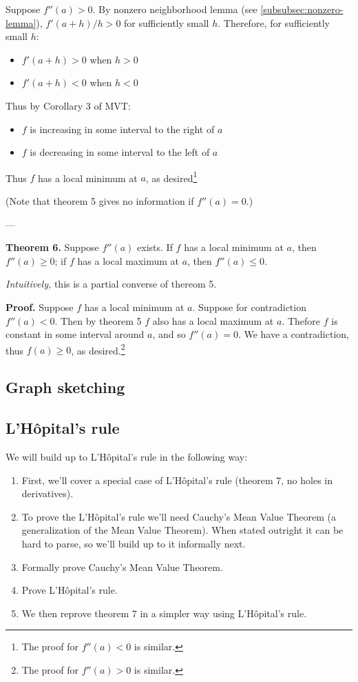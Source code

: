 Suppose $f''(a)>0$. By nonzero neighborhood lemma (see
\ref{subsubsec:nonzero-lemma}), $f'(a+h)/h>0$ for sufficiently small
$h$. Therefore, for sufficiently small $h$:
\begin{itemize}
\item $f'(a+h)>0$ when $h>0$
\item $f'(a+h)<0$ when $h<0$
\end{itemize}

Thus by Corollary 3 of MVT:
\begin{itemize}
\item $f$ is increasing in some interval to the right of $a$
\item $f$ is decreasing in some interval to the left of $a$
\end{itemize}

Thus $f$ has a local minimum at $a$, as desired\footnote{The proof for
  $f''(a)<0$ is similar.}

\vs

(Note that theorem 5 gives no information if $f''(a)=0$.)

\vs---\vs

\textbf{Theorem 6.} Suppose $f''(a)$ exists. If $f$ has a local
minimum at $a$, then $f''(a)\geq0$; if $f$ has a local maximum at $a$,
then $f''(a)\leq 0$.

\vs

\textit{Intuitively,} this is a partial converse of thereom 5.

\vs

\textbf{Proof.} Suppose $f$ has a local minimum at $a$. Suppose for
contradiction $f''(a)<0$. Then by theorem 5 $f$ also has a local
maximum at $a$. Thefore $f$ is constant in some interval around $a$,
and so $f''(a)=0$. We have a contradiction, thus $f(a)\geq 0$, as
desired.\footnote{The proof for $f''(a)>0$ is similar.}


\subsection{Graph sketching}

\subsection{L'H\^opital's rule}
We will build up to L'H\^opital's rule in the following way:

\begin{enumerate}
\item First, we'll cover a special case of L'H\^opital's rule (theorem
  7, no holes in derivatives).
\item To prove the L'H\^opital's rule we'll need Cauchy's Mean Value
  Theorem (a generalization of the Mean Value Theorem). When stated
  outright it can be hard to parse, so we'll build up to it informally
  next.
\item Formally prove Cauchy's Mean Value Theorem.
\item Prove L'H\^opital's rule.
\item We then reprove theorem 7 in a simpler way using L'H\^opital's
  rule.
\end{enumerate}

